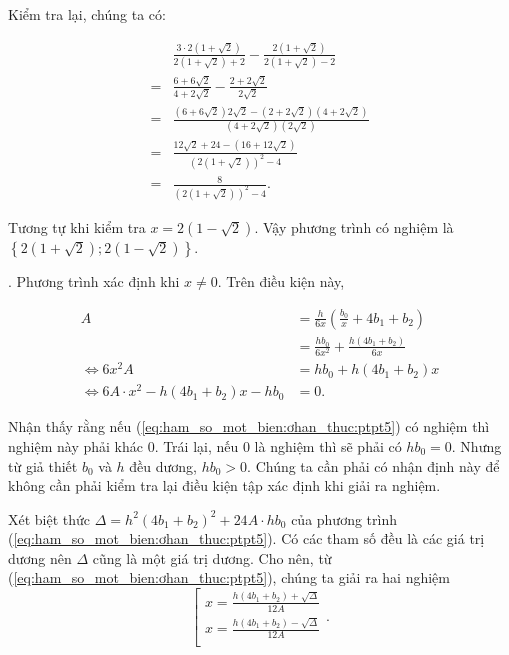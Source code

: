 Kiểm tra lại, chúng ta có:

\begin{align*}
   &\frac{3\cdot 2(1+\sqrt{2})}{2(1+\sqrt{2}) + 2} - \frac{2(1+\sqrt{2})}{2(1+\sqrt{2}) - 2} \\
   = &\frac{6 + 6\sqrt{2}}{4 + 2\sqrt{2}} - \frac{2 + 2\sqrt{2}}{2\sqrt{2}} \\
   = &\frac{\left(6 + 6\sqrt{2}\right)2\sqrt{2} - \left(2 + 2\sqrt{2}\right)\left(4 + 2\sqrt{2}\right)}{\left(4 + 2\sqrt{2}\right)\left(2\sqrt{2}\right)} \\
   = &\frac{12\sqrt{2} + 24 - \left(16 + 12\sqrt{2}\right)}{\left(2\left(1 + \sqrt{2}\right)\right)^2 - 4} \\
   = &\frac{8}{\left(2\left(1 + \sqrt{2}\right)\right)^2 - 4}.
\end{align*}

Tương tự khi kiểm tra $x = 2\left(1 - \sqrt{2}\right)$. Vậy phương trình có nghiệm là $\left\{2\left(1 + \sqrt{2}\right); 2\left(1 - \sqrt{2}\right)\right\}$.

. Phương trình xác định khi $x \neq 0$. Trên điều kiện này,

\begin{align}
   A &= \frac{h}{6x}\left(\frac{b_0}{x} + 4b_1 + b_2\right) \nonumber\\
   &= \frac{hb_0}{6x^2} + \frac{h\left(4b_1 + b_2\right)}{6x} \nonumber\\
   \iff 6x^2A &= hb_0 + h\left(4b_1 + b_2\right)x \nonumber\\
   \iff 6A\cdot x^2 - h\left(4b_1 + b_2\right)x - hb_0 &= 0. \label{eq:ham_so_mot_bien:ơhan_thuc:ptpt5}
\end{align}

Nhận thấy rằng nếu (\ref{eq:ham_so_mot_bien:ơhan_thuc:ptpt5}) có nghiệm thì nghiệm này phải khác $0$. Trái lại, nếu $0$ là nghiệm thì sẽ phải có $hb_0 = 0$. Nhưng từ giả thiết $b_0$ và $h$ đều dương, $hb_0 > 0$. Chúng ta cần phải có nhận định này để không cần phải kiểm tra lại điều kiện tập xác định khi giải ra nghiệm.

Xét biệt thức $\Delta = h^2(4b_1 + b_2)^2 + 24A\cdot hb_0$ của phương trình (\ref{eq:ham_so_mot_bien:ơhan_thuc:ptpt5}). Có các tham số đều là các giá trị dương nên $\Delta$ cũng là một giá trị dương. Cho nên, từ (\ref{eq:ham_so_mot_bien:ơhan_thuc:ptpt5}), chúng ta giải ra hai nghiệm
\begin{equation*}
   \left[\begin{array}{l}
      x = \frac{h\left(4b_1 + b_2\right) + \sqrt{\Delta}}{12A} \\
      x = \frac{h\left(4b_1 + b_2\right) - \sqrt{\Delta}}{12A} \\
   \end{array}\right..
\end{equation*}

